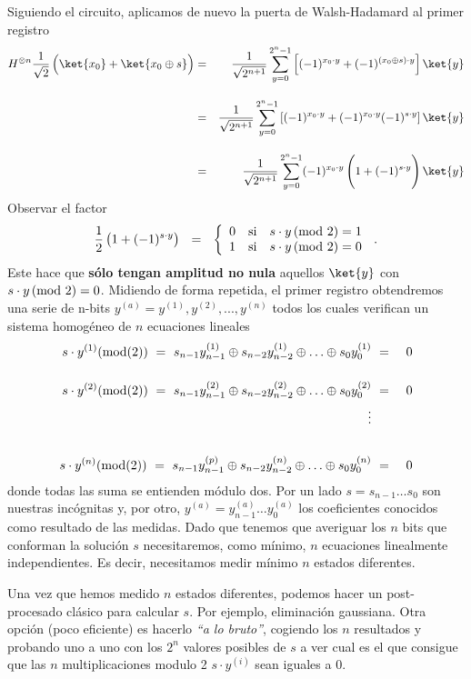 \documentclass[a4paper,11pt]{book} %
\numberwithin{equation}{chapter}
\begin{document}
\begin{itemize}
	Siguiendo el circuito, aplicamos de nuevo la puerta de Walsh-Hadamard al primer registro 
	\begin{eqnarray}
	H^{\otimes n} \frac{1}{\sqrt{2}} \left( \rule{0mm}{4mm} \ket{x_0} + \ket{x_0 \oplus s} \right) &=& \frac{1}{\sqrt{2^{n+1}}} \sum_{y=0}^{2^n-1} \left[ (-1)^{x_0\cdot y} + (-1)^{(x_0\oplus s) \cdot y}\right]  \ket{y} \nonumber\\ 	\rule{0mm}{10mm}
	&=& \frac{1}{\sqrt{2^{n+1}}} \sum_{y=0}^{2^n-1} \left[ (-1)^{x_0\cdot y} + (-1)^{x_0 \cdot y}(-1)^{ s \cdot y}\right]  \ket{y} \nonumber\\ \rule{0mm}{10mm}
	&=&  \frac{1}{\sqrt{2^{n+1}}} \sum_{y=0}^{2^n-1}(-1)^{x_0\cdot y}  \left( \rule{0mm}{6mm} 1+ (-1)^{s \cdot y}\right) \ket{y}
	\end{eqnarray}
	Observar  el factor 
	\begin{equation}
	\frac{1}{2}\left( \rule{0mm}{3mm} 1+ (-1)^{s \cdot y}\right)~~ = ~~ 
	\left\{\begin{array}{ccc} 0 &\hbox{si}&  s \cdot y\, (\hbox{mod 2}) = 1 \\ 
	1 &\hbox{si} & s\cdot y\, (\hbox{mod 2}) = 0\end{array}
	\right.  \,.
	\end{equation} 
	Este hace que \textbf{sólo tengan amplitud no nula} aquellos  $\ket{y}$ con $s\cdot y\,  (\hbox{mod 2})= 0$. Midiendo de forma repetida, el primer registro obtendremos una serie de n-bits $ y^{(a)} = y^{(1)},y^{(2)},...,y^{(n)}$ todos los cuales  verifican un sistema homogéneo de $n$ ecuaciones lineales 
	\begin{eqnarray}
	s\cdot y^{(1)} (\hbox{mod(2)})~=~ s_{n-1}y^{(1)}_{n-1} \oplus s_{n-2}y^{(1)}_{n-2} \oplus \ldots \oplus s_0 y^{(1)}_0  &~=~& 0 \nonumber\\ \rule{0mm}{8mm}
	s\cdot y^{(2)} (\hbox{mod(2)}) ~=~ s_{n-1}y^{(2)}_{n-1} \oplus s_{n-2}y^{(2)}_{n-2} \oplus \ldots \oplus s_0 y^{(2)}_0 &~=~& 0 \nonumber\\
	\vdots & & \nonumber\\ \rule{0mm}{10mm}
	s\cdot y^{(n)} (\hbox{mod(2)}) ~=~ s_{n-1}y^{(p)}_{n-1} \oplus s_{n-2}y^{(n)}_{n-2} \oplus \ldots \oplus s_0 y^{(n)}_0 &~=~& 0 \nonumber\\
	\end{eqnarray}
	donde todas las suma se entienden módulo dos. Por un lado $s=s_{n-1}\ldots s_0$ son nuestras incógnitas y, por otro, $y^{(a)} = y^{(a)}_{n-1}\ldots y^{(a)}_0$ los coeficientes conocidos como resultado de las medidas. Dado que tenemos que averiguar los $n$ bits que conforman la solución $s$ necesitaremos, como mínimo, $n$ ecuaciones linealmente independientes. Es decir, necesitamos medir mínimo $n$ estados diferentes.
	
	Una vez que hemos medido $n$ estados diferentes, podemos hacer un post-procesado clásico para calcular $s$. Por ejemplo, eliminación gaussiana. Otra opción (poco eficiente) es hacerlo \textit{``a lo bruto''}, cogiendo los $n$ resultados y probando uno a uno con los $2^n$ valores posibles de $s$ a ver cual es el que consigue que las $n$ multiplicaciones modulo 2 $s \cdot y^{(i)}$ sean iguales a 0. 

\end{itemize}
\end{document}
